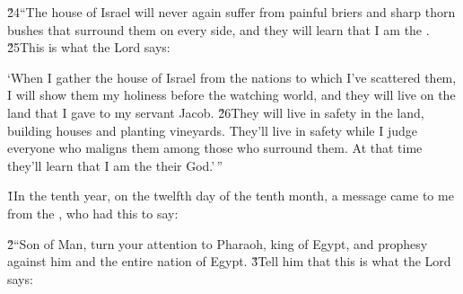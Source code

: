 \v{24}``The house of Israel will never again suffer from painful briers and sharp thorn bushes that surround them on every side, and they will learn that I am the . \v{25}This is what the Lord  says:

`When I gather the house of Israel from the nations to which I've scattered them, I will show them my holiness before the watching world, and they will live on the land that I gave to my servant Jacob. \v{26}They will live in safety in the land, building houses and planting vineyards. They'll live in safety while I judge everyone who maligns them among those who surround them. At that time they'll learn that I am the  their God.'\,''

\v{1}In the tenth year, on the twelfth day of the tenth month, a message came to me from the , who had this to say:

\v{2}``Son of Man, turn your attention to Pharaoh, king of Egypt, and prophesy against him and the entire nation of Egypt. \v{3}Tell him that this is what the Lord  says:

